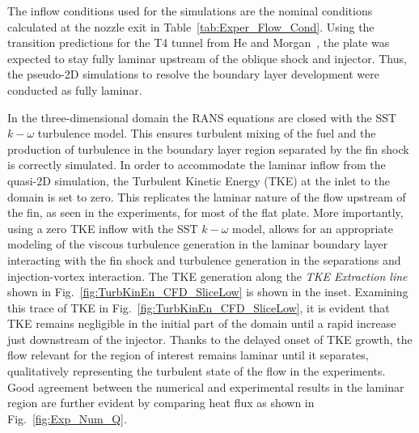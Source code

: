 \documentclass{AIAA}
\begin{document}
The inflow conditions used for the simulations are the nominal conditions calculated at the nozzle exit in Table~\ref{tab:Exper_Flow_Cond}.
Using the transition predictions for the T4 tunnel from He and Morgan~\cite{He_Morgan}, the plate was expected to stay fully laminar upstream of the oblique shock and injector.
Thus, the pseudo-2D simulations to resolve the boundary layer development were conducted as fully laminar.

In the three-dimensional domain the RANS equations are closed with the SST $k-\omega$ turbulence model.
This ensures turbulent mixing of the fuel and the production of turbulence in the boundary layer region separated by the fin shock is correctly simulated.
In order to accommodate the laminar inflow from the quasi-2D simulation, the Turbulent Kinetic Energy (TKE) at the inlet to the domain is set to zero.
This replicates the laminar nature of the flow upstream of the fin, as seen in the experiments, for most of the flat plate.
More importantly, using a zero TKE inflow with the SST $k-\omega$ model, allows for an appropriate modeling of the viscous turbulence generation in the laminar boundary layer interacting with the fin shock and turbulence generation in the separations and injection-vortex interaction.
The TKE generation along the {\it TKE Extraction line} shown in Fig.~\ref{fig:TurbKinEn_CFD_SliceLow} is shown in the inset.
Examining this trace of TKE in Fig.~\ref{fig:TurbKinEn_CFD_SliceLow}, it is evident that TKE remains negligible in the initial part of the domain until a rapid increase just downstream of the injector.
Thanks to the delayed onset of TKE growth, the flow relevant for the region of interest remains laminar until it separates, qualitatively representing the turbulent state of the flow in the experiments.
Good agreement between the numerical and experimental results in the laminar region are further evident by comparing heat flux as shown in Fig.~\ref{fig:Exp_Num_Q}.
\end{document}

